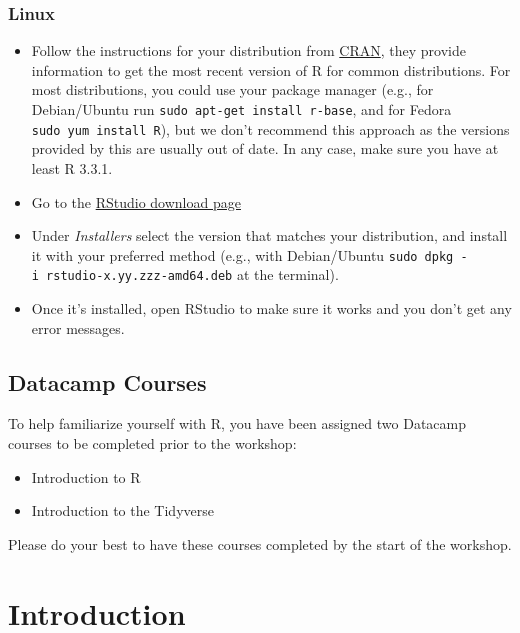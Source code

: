 \documentclass[
]{book}
\providecommand{\tightlist}{%
  \setlength{\itemsep}{0pt}\setlength{\parskip}{0pt}}
\begin{document}
\subsection{Linux}\label{linux}

\begin{itemize}
\tightlist
\item
  Follow the instructions for your distribution
  from \href{https://cloud.r-project.org/bin/linux}{CRAN}, they provide information
  to get the most recent version of R for common distributions. For most
  distributions, you could use your package manager (e.g., for Debian/Ubuntu run
  \texttt{sudo\ apt-get\ install\ r-base}, and for Fedora \texttt{sudo\ yum\ install\ R}), but we
  don't recommend this approach as the versions provided by this are
  usually out of date. In any case, make sure you have at least R 3.3.1.
\item
  Go to the
  \href{https://www.rstudio.com/products/rstudio/download/\#download}{RStudio download page}
\item
  Under \emph{Installers} select the version that matches your distribution, and
  install it with your preferred method (e.g., with Debian/Ubuntu \texttt{sudo\ dpkg\ -i\ rstudio-x.yy.zzz-amd64.deb} at the terminal).
\item
  Once it's installed, open RStudio to make sure it works and you don't get any
  error messages.
\end{itemize}

\section{Datacamp Courses}\label{datacamp-courses}

To help familiarize yourself with R, you have been assigned two Datacamp courses to be completed prior to the workshop:

\begin{itemize}
\tightlist
\item
  Introduction to R
\item
  Introduction to the Tidyverse
\end{itemize}

Please do your best to have these courses completed by the start of the workshop.

\chapter{Introduction}\label{introduction}
\end{document}
